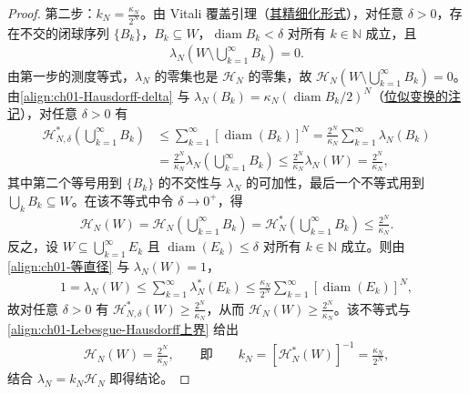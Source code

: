 \documentclass[../../main.tex]{subfiles}%
\begin{document}
\begin{proof}
第二步：$k_N=\frac{\kappa_N}{2^N}$。由 Vitali 覆盖引理（\hyperref[remark:ch01-Vitali精细化]{其精细化形式}），对任意 $\delta>0$，存在不交的闭球序列 $\{B_k\}$，$B_k\subseteq W$，$\operatorname{diam}B_k<\delta$ 对所有 $k\in\mathbb{N}$ 成立，且
\begin{align*}
\lambda_N\left(W\setminus\bigcup_{k=1}^\infty B_k\right)=0 .
\end{align*}
由第一步的测度等式，$\lambda_N$ 的零集也是 $\mathcal{H}_N$ 的零集，故 $\mathcal{H}_N\left(W\setminus\bigcup_{k=1}^\infty B_k\right)=0$。由\eqref{align:ch01-Hausdorff-delta} 与 $\lambda_N(B_k)=\kappa_N\left(\operatorname{diam}B_k/2\right)^N$（\hyperref[remark:ch01-位似]{位似变换的注记}），对任意 $\delta>0$ 有
\begin{align*}
\mathcal{H}_{N,\delta}^*\left(\bigcup_{k=1}^\infty B_k\right)
&\leqslant\sum_{k=1}^\infty\left[\operatorname{diam}(B_k)\right]^N
=\frac{2^N}{\kappa_N}\sum_{k=1}^\infty\lambda_N(B_k)\\
&=\frac{2^N}{\kappa_N}\lambda_N\left(\bigcup_{k=1}^\infty B_k\right)
\leqslant\frac{2^N}{\kappa_N}\lambda_N(W)=\frac{2^N}{\kappa_N},
\end{align*}
其中第二个等号用到 $\{B_k\}$ 的不交性与 $\lambda_N$ 的可加性，最后一个不等式用到 $\bigcup_kB_k\subseteq W$。在该不等式中令 $\delta\to0^+$，得
\begin{align}
\mathcal{H}_N(W)=\mathcal{H}_N\left(\bigcup_{k=1}^\infty B_k\right)
=\mathcal{H}_N^*\left(\bigcup_{k=1}^\infty B_k\right)\leqslant\frac{2^N}{\kappa_N}. \label{align:ch01-Lebesgue-Hausdorff上界}
\end{align}
反之，设 $W\subseteq\bigcup_{k=1}^\infty E_k$ 且 $\operatorname{diam}(E_k)\leqslant\delta$ 对所有 $k\in\mathbb{N}$ 成立。则由\eqref{align:ch01-等直径} 与 $\lambda_N(W)=1$，
\begin{align*}
1=\lambda_N(W)\leqslant\sum_{k=1}^\infty\lambda_N^*(E_k)
\leqslant\frac{\kappa_N}{2^N}\sum_{k=1}^\infty\left[\operatorname{diam}(E_k)\right]^N ,
\end{align*}
故对任意 $\delta>0$ 有 $\mathcal{H}_{N,\delta}^*(W)\geqslant\frac{2^N}{\kappa_N}$，从而 $\mathcal{H}_N(W)\geqslant\frac{2^N}{\kappa_N}$。该不等式与\eqref{align:ch01-Lebesgue-Hausdorff上界} 给出
\begin{align*}
\mathcal{H}_N(W)=\frac{2^N}{\kappa_N},\qquad\text{即}\qquad k_N=\left[\mathcal{H}_N^*(W)\right]^{-1}=\frac{\kappa_N}{2^N},
\end{align*}
结合 $\lambda_N=k_N\mathcal{H}_N$ 即得结论。
\end{proof}
\end{document}
